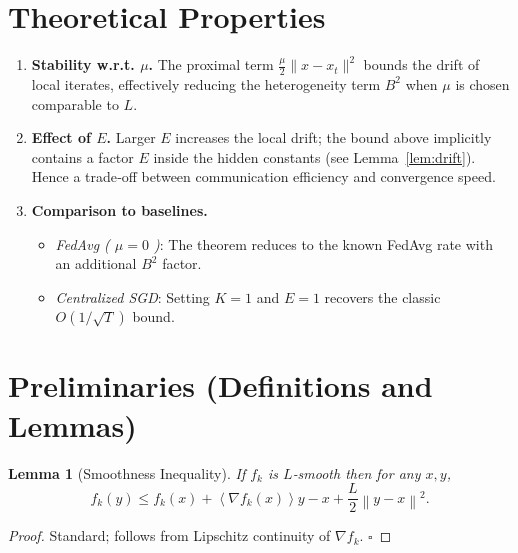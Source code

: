 \documentclass{article}
\newtheorem{lemma}{Lemma}
\newcommand{\norm}[1]{\left\lVert#1\right\rVert}
\newcommand{\inner}[1]{\left\langle#1\right\rangle}
\begin{document}
\section*{Theoretical Properties}
\begin{enumerate}[leftmargin=*]
    \item \textbf{Stability w.r.t. $\mu$.} The proximal term $\frac{\mu}{2}\|x-x_t\|^{2}$ bounds the drift of local iterates, effectively reducing the heterogeneity term $B^{2}$ when $\mu$ is chosen comparable to $L$.
    \item \textbf{Effect of $E$.} Larger $E$ increases the local drift; the bound above implicitly contains a factor $E$ inside the hidden constants (see Lemma~\ref{lem:drift}). Hence a trade‑off between communication efficiency and convergence speed.
    \item \textbf{Comparison to baselines.}
    \begin{itemize}
        \item \emph{FedAvg ( $\mu=0$ )}: The theorem reduces to the known FedAvg rate with an additional $B^{2}$ factor.
        \item \emph{Centralized SGD}: Setting $K=1$ and $E=1$ recovers the classic $O(1/\sqrt{T})$ bound.
    \end{itemize}
\end{enumerate}

\section*{Preliminaries (Definitions and Lemmas)}
\begin{lemma}[Smoothness Inequality]\label{lem:smooth}
If $f_k$ is $L$‑smooth then for any $x,y$,
\[
f_k(y)\le f_k(x)+\inner{\nabla f_k(x)}{y-x}+\frac{L}{2}\norm{y-x}^{2}.
\]
\end{lemma}
\begin{proof}
Standard; follows from Lipschitz continuity of $\nabla f_k$. \hfill $\square$
\end{proof}
\end{document}
